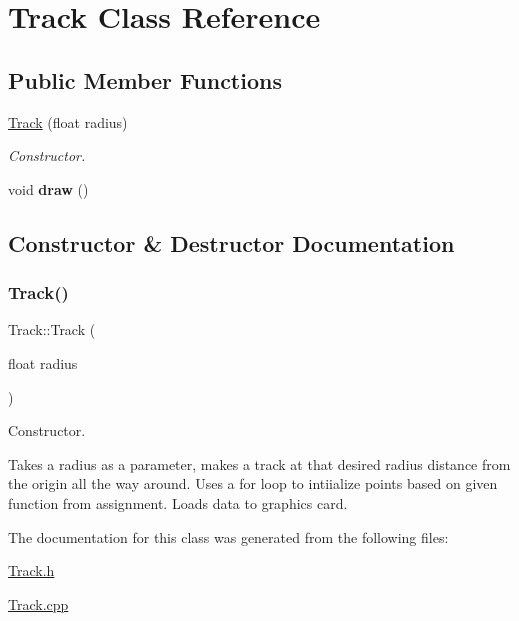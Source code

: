 \hypertarget{class_track}{}\section{Track Class Reference}
\label{class_track}
\subsection*{Public Member Functions}
\begin{DoxyCompactItemize}
\item 
\hyperlink{class_track_a90f138b74282bdb3b67c56da91a9f610}{Track} (float radius)
\begin{DoxyCompactList}\small\item\em Constructor. \end{DoxyCompactList}\item 
\mbox{\label{class_track_ae6915f80cb3dce3906a94e256a7b5454}} 
void {\bfseries draw} ()
\end{DoxyCompactItemize}


\subsection{Constructor \& Destructor Documentation}
\mbox{\label{class_track_a90f138b74282bdb3b67c56da91a9f610}} 
\subsubsection{\texorpdfstring{Track()}{Track()}}
{\footnotesize\ttfamily Track\+::\+Track (\begin{DoxyParamCaption}\item[{float}]{radius }\end{DoxyParamCaption})}



Constructor. 

Takes a radius as a parameter, makes a track at that desired radius distance from the origin all the way around. Uses a for loop to intiialize points based on given function from assignment. Loads data to graphics card. 

The documentation for this class was generated from the following files\+:\begin{DoxyCompactItemize}
\item 
\hyperlink{_track_8h}{Track.\+h}\item 
\hyperlink{_track_8cpp}{Track.\+cpp}\end{DoxyCompactItemize}

